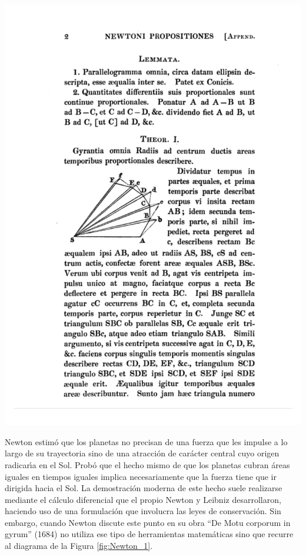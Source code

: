  \begin{marginfigure}
  \includegraphics[width=\linewidth]{figuraNewton.pdf}
  \caption{P\'agina de ``De Motu corporum in gyrum'' en la que Newton utiliza una aproximaci\'on discreta, reemplazando el efecto de una fuerza cont\'\i{}nua por una sucesi\'on de impulsos que se suceden a int\'ervalos regulares de tiempo.
\url{http://www.newtonproject.sussex.ac.uk/view/texts/normalized/NATP00089}}
  \label{fig:Newton_1}
\end{marginfigure}



 Newton estim\'o que los planetas no precisan de una fuerza que les impulse a lo largo de su trayectoria sino de una atracci\'on de car\'acter central cuyo origen radicar\'\i{}a en el Sol. Prob\'o que el hecho mismo de que los planetas cubran \'areas iguales en tiempos iguales implica necesariamente que la fuerza tiene que ir dirigida hacia el Sol. La demostraci\'on moderna de este hecho suele realizarse mediante el c\'alculo diferencial que el propio Newton y Leibniz desarrollaron, haciendo uso de una formulaci\'on  que involucra las leyes de conservaci\'on\cite{tagkey1976iv}. Sin embargo, cuando Newton discute este punto en su obra ``De Motu corporum in gyrum'' (1684) no utiliza ese tipo de herramientas matem\'aticas sino que recurre al diagrama de la  Figura \ref{fig:Newton_1}. 
 

